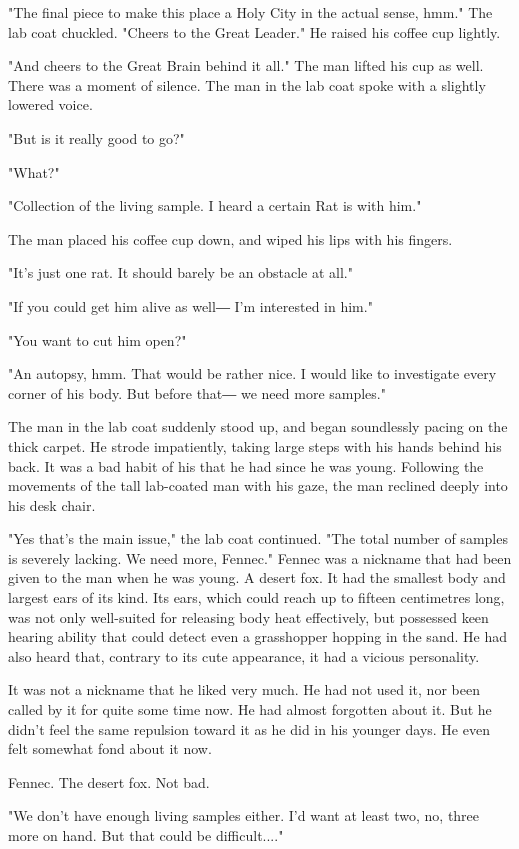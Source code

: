 "The final piece to make this place a Holy City in the actual sense,
hmm." The lab coat chuckled. "Cheers to the Great Leader." He raised his
coffee cup lightly.

"And cheers to the Great Brain behind it all." The man lifted his cup as
well. There was a moment of silence. The man in the lab coat spoke with
a slightly lowered voice.

"But is it really good to go?"

"What?"

"Collection of the living sample. I heard a certain Rat is with him."

The man placed his coffee cup down, and wiped his lips with his fingers.

"It's just one rat. It should barely be an obstacle at all."

"If you could get him alive as well― I'm interested in him."

"You want to cut him open?"

"An autopsy, hmm. That would be rather nice. I would like to investigate
every corner of his body. But before that― we need more samples."

The man in the lab coat suddenly stood up, and began soundlessly pacing
on the thick carpet. He strode impatiently, taking large steps with his
hands behind his back. It was a bad habit of his that he had since he
was young. Following the movements of the tall lab-coated man with his
gaze, the man reclined deeply into his desk chair.

"Yes that's the main issue," the lab coat continued. "The total number
of samples is severely lacking. We need more, Fennec." Fennec was a
nickname that had been given to the man when he was young. A desert fox.
It had the smallest body and largest ears of its kind. Its ears, which
could reach up to fifteen centimetres long, was not only well-suited for
releasing body heat effectively, but possessed keen hearing ability that
could detect even a grasshopper hopping in the sand. He had also heard
that, contrary to its cute appearance, it had a vicious personality.

It was not a nickname that he liked very much. He had not used it, nor
been called by it for quite some time now. He had almost forgotten about
it. But he didn't feel the same repulsion toward it as he did in his
younger days. He even felt somewhat fond about it now.

Fennec. The desert fox. Not bad.

"We don't have enough living samples either. I'd want at least two, no,
three more on hand. But that could be difficult...."

